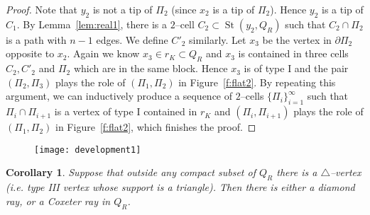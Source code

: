 \documentclass[11pt]{amsart}
\newcommand{\St}{\operatorname{St}}
\newtheorem{corollary}[theorem]{Corollary}
\theoremstyle{definition}
\begin{document}
\begin{proof}
Note that $y_2$ is not a tip of $\Pi_2$ (since $x_2$ is a tip of $\Pi_2$). Hence $y_2$ is a tip of $C_1$. By Lemma~\ref{lem:real1}, there is a $2$--cell $C_2\subset\St(y_2,Q_R)$ such that $C_2\cap \Pi_2$ is a path with $n-1$ edges. We define $C'_2$ similarly. Let $x_3$ be the vertex in $\partial\Pi_2$ opposite to $x_2$. Again we know $x_3\in r_K\subset Q_R$ and $x_3$ is contained in three cells $C_2,C'_2$ and $\Pi_2$ which are in the same block. Hence $x_3$ is of type I and the pair $(\Pi_2,\Pi_3)$ plays the role of $(\Pi_1,\Pi_2)$ in Figure~\ref{f:flat2}. By repeating this argument, we can inductively produce a sequence of $2$--cells $\{\Pi_i\}_{i=1}^{\infty}$ such that $\Pi_i\cap\Pi_{i+1}$ is a vertex of type I contained in $r_K$ and $(\Pi_i,\Pi_{i+1})$ plays the role of $(\Pi_1,\Pi_2)$ in Figure~\ref{f:flat2}, which finishes the proof.
\end{proof}
\begin{figure}[h!]
	\centering
	\texttt{[image: development1]}
	\caption{}
	\label{f:development1}
\end{figure}

\begin{corollary}
	\label{cor:delta point}
Suppose that outside any compact subset of $Q_R$ there is a $\triangle$--vertex (i.e. type III vertex whose support is a triangle). Then there is either a diamond ray, or a Coxeter ray in $Q_R$.
\end{corollary}
\end{document}
